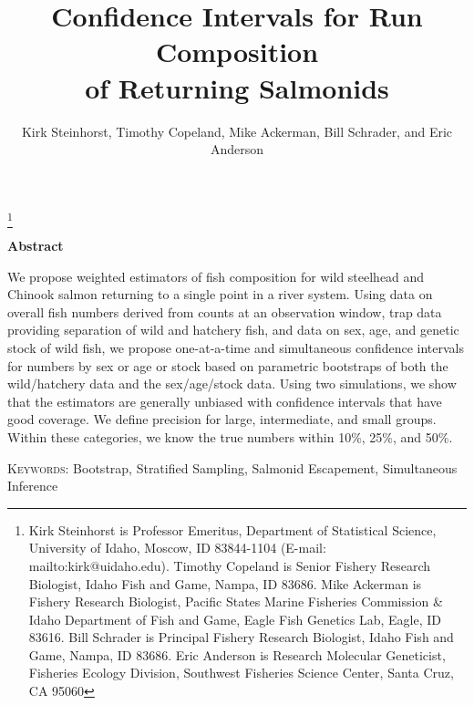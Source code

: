 \documentclass[11pt]{article}
\begin{document}
\title{Confidence Intervals for Run Composition \\ of Returning Salmonids}
\author{Kirk Steinhorst, Timothy Copeland, Mike Ackerman, Bill Schrader, and Eric Anderson 
}
\maketitle

\footnote{Kirk Steinhorst is Professor Emeritus, Department of Statistical Science, University of Idaho, Moscow, ID 83844-1104 (E-mail: mailto:kirk@uidaho.edu). Timothy Copeland is Senior Fishery Research Biologist, Idaho Fish and Game, Nampa, ID 83686. Mike Ackerman is Fishery Research Biologist, Pacific States Marine Fisheries Commission \& Idaho Department of Fish and Game, Eagle Fish Genetics Lab, Eagle, ID 83616. Bill Schrader is Principal Fishery Research Biologist, Idaho Fish and Game, Nampa, ID 83686. Eric Anderson is Research Molecular Geneticist, Fisheries Ecology Division, Southwest Fisheries Science Center, Santa Cruz, CA 95060}


\newpage
\begin{center}
\textbf{Abstract}
\end{center}
We propose weighted estimators of fish composition for wild steelhead and Chinook salmon returning to a single point in a river system.  Using data on overall fish numbers derived from counts at an observation window, trap data providing separation of wild and hatchery fish, and data on sex, age, and genetic stock of wild fish, we propose one-at-a-time and simultaneous confidence intervals for numbers by sex or age or stock based on parametric bootstraps of both the wild/hatchery data and the sex/age/stock data.  Using two simulations, we show that the estimators are generally unbiased with confidence intervals that have good coverage.  We define precision for large, intermediate, and small groups.  Within these categories, we know the true numbers  within 10\%, 25\%, and 50\%.

\vspace*{.3in}

\noindent\textsc{Keywords}: {Bootstrap, Stratified Sampling, Salmonid Escapement, Simultaneous Inference}

\newpage
\end{document}
